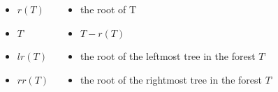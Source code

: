 \documentclass{beamer}
\begin{document}
\begin{frame}
\begin{columns}[c]
\begin{itemize}
\item \emph{$r(T)$}
\item \emph{$T^{\comp}$}
\item \emph{$lr(T)$}
\item \emph{$rr(T)$}
\end{itemize}
\begin{itemize}[]
\item[]  the root of T
\item[] $T - r(T)$
\item[]  the root of the leftmost tree in the forest $T^{\comp}$
\item[]  the root of the rightmost tree in the forest $T^{\comp}$
\end{itemize}
\end{columns}
\end{frame}
\end{document}
